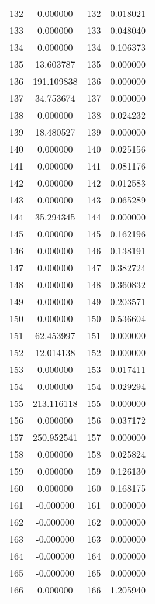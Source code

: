 \documentclass[12pt]{article}
\begin{document}
\begin{longtable}{@{}cccc@{}}
132 & 0.000000 & 132 & 0.018021 \\
133 & 0.000000 & 133 & 0.048040 \\
134 & 0.000000 & 134 & 0.106373 \\
135 & 13.603787 & 135 & 0.000000 \\
136 & 191.109838 & 136 & 0.000000 \\
137 & 34.753674 & 137 & 0.000000 \\
138 & 0.000000 & 138 & 0.024232 \\
139 & 18.480527 & 139 & 0.000000 \\
140 & 0.000000 & 140 & 0.025156 \\
141 & 0.000000 & 141 & 0.081176 \\
142 & 0.000000 & 142 & 0.012583 \\
143 & 0.000000 & 143 & 0.065289 \\
144 & 35.294345 & 144 & 0.000000 \\
145 & 0.000000 & 145 & 0.162196 \\
146 & 0.000000 & 146 & 0.138191 \\
147 & 0.000000 & 147 & 0.382724 \\
148 & 0.000000 & 148 & 0.360832 \\
149 & 0.000000 & 149 & 0.203571 \\
150 & 0.000000 & 150 & 0.536604 \\
151 & 62.453997 & 151 & 0.000000 \\
152 & 12.014138 & 152 & 0.000000 \\
153 & 0.000000 & 153 & 0.017411 \\
154 & 0.000000 & 154 & 0.029294 \\
155 & 213.116118 & 155 & 0.000000 \\
156 & 0.000000 & 156 & 0.037172 \\
157 & 250.952541 & 157 & 0.000000 \\
158 & 0.000000 & 158 & 0.025824 \\
159 & 0.000000 & 159 & 0.126130 \\
160 & 0.000000 & 160 & 0.168175 \\
161 & -0.000000 & 161 & 0.000000 \\
162 & -0.000000 & 162 & 0.000000 \\
163 & -0.000000 & 163 & 0.000000 \\
164 & -0.000000 & 164 & 0.000000 \\
165 & -0.000000 & 165 & 0.000000 \\
166 & 0.000000 & 166 & 1.205940 \\

\end{longtable}
\end{document}
